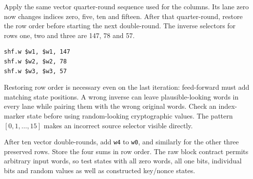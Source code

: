 Apply the same vector quarter-round sequence used for the columns. Its lane zero
now changes indices zero, five, ten and fifteen. After that quarter-round, restore
the row order before starting the next double-round. The inverse selectors for rows
one, two and three are 147, 78 and 57.
\begin{verbatim}
shf.w $w1, $w1, 147
shf.w $w2, $w2, 78
shf.w $w3, $w3, 57
\end{verbatim}

Restoring row order is necessary even on the last iteration: feed-forward must add
matching state positions. A wrong inverse can leave plausible-looking words in
every lane while pairing them with the wrong original words. Check an index-marker
state before using random-looking cryptographic values. The pattern
\([0,1,\ldots,15]\) makes an incorrect source selector visible directly.

After ten vector double-rounds, add \texttt{w4} to \texttt{w0}, and similarly for
the other three preserved rows. Store the four sums in row order. The raw block
contract permits arbitrary input words, so test states with all zero words, all one
bits, individual bits and random values as well as constructed key/nonce states.
